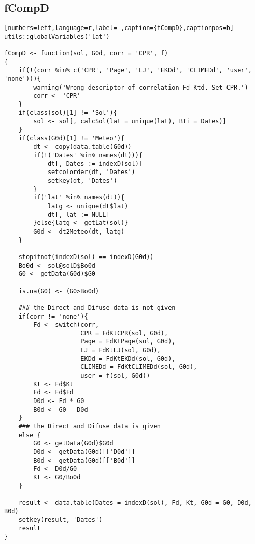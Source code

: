 \subsection{fCompD}
\label{sec:org5901bbe}
\label{subsec:fcompd}
\begin{lstlisting}[numbers=left,language=r,label= ,caption={fCompD},captionpos=b]
utils::globalVariables('lat')

fCompD <- function(sol, G0d, corr = 'CPR', f)
{
    if(!(corr %in% c('CPR', 'Page', 'LJ', 'EKDd', 'CLIMEDd', 'user', 'none'))){
        warning('Wrong descriptor of correlation Fd-Ktd. Set CPR.')
        corr <- 'CPR'
    }
    if(class(sol)[1] != 'Sol'){
        sol <- sol[, calcSol(lat = unique(lat), BTi = Dates)]
    }
    if(class(G0d)[1] != 'Meteo'){
        dt <- copy(data.table(G0d))
        if(!('Dates' %in% names(dt))){
            dt[, Dates := indexD(sol)]
            setcolorder(dt, 'Dates')
            setkey(dt, 'Dates')
        }
        if('lat' %in% names(dt)){
            latg <- unique(dt$lat)
            dt[, lat := NULL]
        }else{latg <- getLat(sol)}
        G0d <- dt2Meteo(dt, latg)
    }  

    stopifnot(indexD(sol) == indexD(G0d))
    Bo0d <- sol@solD$Bo0d
    G0 <- getData(G0d)$G0

    is.na(G0) <- (G0>Bo0d)

    ### the Direct and Difuse data is not given
    if(corr != 'none'){
        Fd <- switch(corr,
                     CPR = FdKtCPR(sol, G0d),
                     Page = FdKtPage(sol, G0d),
                     LJ = FdKtLJ(sol, G0d),
                     EKDd = FdKtEKDd(sol, G0d),
                     CLIMEDd = FdKtCLIMEDd(sol, G0d),
                     user = f(sol, G0d))
        Kt <- Fd$Kt
        Fd <- Fd$Fd
        D0d <- Fd * G0
        B0d <- G0 - D0d
    }
    ### the Direct and Difuse data is given
    else {
        G0 <- getData(G0d)$G0d
        D0d <- getData(G0d)[['D0d']]
        B0d <- getData(G0d)[['B0d']]
        Fd <- D0d/G0
        Kt <- G0/Bo0d
    }

    result <- data.table(Dates = indexD(sol), Fd, Kt, G0d = G0, D0d, B0d)
    setkey(result, 'Dates')
    result
}
\end{lstlisting}
